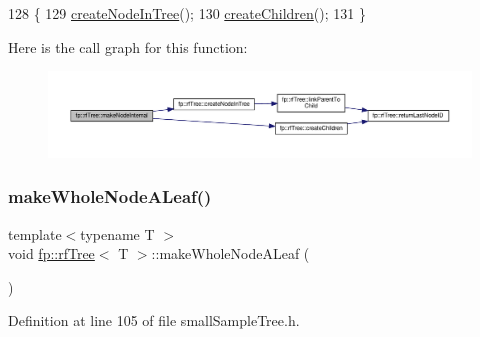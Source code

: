 \begin{DoxyCode}
128                                               \{
129                     \hyperlink{classfp_1_1rfTree_aaf9d8cdfbb1d10da53a375ea8204e393}{createNodeInTree}();
130                     \hyperlink{classfp_1_1rfTree_ad226037e7f93c0fa2a1a960e19a87bed}{createChildren}();
131                 \}
\end{DoxyCode}
Here is the call graph for this function\+:
\nopagebreak
\begin{figure}[H]
\begin{center}
\leavevmode
\includegraphics[width=350pt]{classfp_1_1rfTree_aaf7bbdde5f7313c3e84853bbf5fdf792_cgraph}
\end{center}
\end{figure}
\mbox{\label{classfp_1_1rfTree_a2b2a47186c0784415609f1c9b005e702}} 
\subsubsection{\texorpdfstring{make\+Whole\+Node\+A\+Leaf()}{makeWholeNodeALeaf()}\hspace{0.1cm}{\footnotesize\ttfamily [1/2]}}
{\footnotesize\ttfamily template$<$typename T $>$ \\
void \hyperlink{classfp_1_1rfTree}{fp\+::rf\+Tree}$<$ T $>$\+::make\+Whole\+Node\+A\+Leaf (\begin{DoxyParamCaption}{ }\end{DoxyParamCaption})\hspace{0.3cm}{\ttfamily [inline]}}



Definition at line 105 of file small\+Sample\+Tree.\+h.


